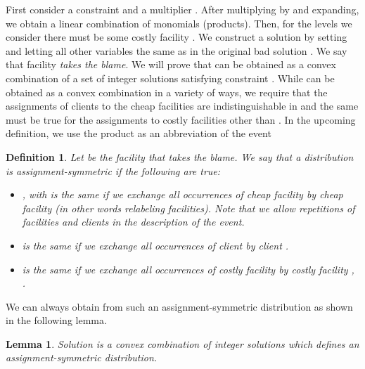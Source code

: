 \documentclass[11pt]{article}
\newtheorem{definition}{Definition}[section]
\newtheorem{lemma}{Lemma}[section]
\begin{document}
\begin{comment}
\end{comment}





First   consider  a  constraint    and a multiplier .   After multiplying by  and
expanding,  we obtain
a   linear  combination   of  monomials
(products). Then, for the   levels
we  consider   there  must  be   some  costly  facility   .  We construct  a solution    by setting
  and letting  all  other
variables the  same as in the  original bad solution .  We say that
facility    \emph{takes the  blame}.  We  will   prove  that
 can be obtained as a convex combination  of a set of
integer   solutions    satisfying   constraint   .  While
 can be obtained as a convex combination  in a variety of
ways, we require that the assignments of clients to the cheap facilities are
indistinguishable in  and the same must be true for the assignments to
costly facilities other than .  In the upcoming definition, we 
use  the product  as an  abbreviation
of the event  

\begin{definition}
 Let  be the facility that takes the blame. We say that a distribution  is \emph{assignment-symmetric}  if the following are true:
\vspace*{-0.1cm}
\begin{itemize}
\item[1] ,  with  is the same if we exchange all occurrences of cheap facility  by cheap facility  (in other words relabeling facilities). Note that we allow repetitions of facilities and clients in the description of the event.

\item[2]   is the same if we exchange all occurrences of client  by client .

\item[3]   is the same if we exchange all occurrences of costly facility  by costly facility , .
\end{itemize}
\end{definition}
\vspace*{-0.1cm}

We can always obtain  from such an assignment-symmetric distribution  as shown
in the following lemma. 

\begin{lemma}\label{assi-sym}
Solution  is a convex combination  of integer solutions which defines an assign\-ment-symmetric distribution.
\end{lemma}
\end{document}
